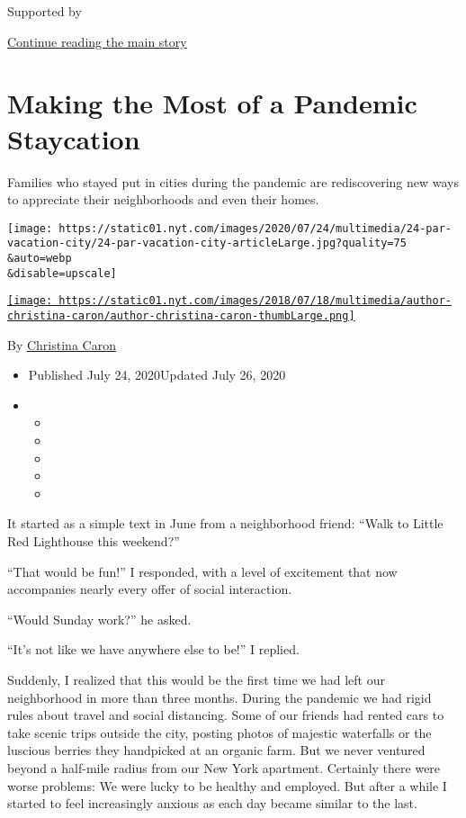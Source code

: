 Supported by

\protect\hyperlink{after-sponsor}{Continue reading the main story}

\hypertarget{making-the-most-of-a-pandemic-staycation}{%
\section{Making the Most of a Pandemic
Staycation}\label{making-the-most-of-a-pandemic-staycation}}

Families who stayed put in cities during the pandemic are rediscovering
new ways to appreciate their neighborhoods and even their homes.

\texttt{[image: https://static01.nyt.com/images/2020/07/24/multimedia/24-par-vacation-city/24-par-vacation-city-articleLarge.jpg?quality=75\\\&auto=webp\\\&disable=upscale]}

\href{https://www.nytimes.com/by/christina-caron}{\texttt{[image: https://static01.nyt.com/images/2018/07/18/multimedia/author-christina-caron/author-christina-caron-thumbLarge.png]}}

By \href{https://www.nytimes.com/by/christina-caron}{Christina Caron}

\begin{itemize}
\item
  Published July 24, 2020Updated July 26, 2020
\item
  \begin{itemize}
  \item
  \item
  \item
  \item
  \item
  \end{itemize}
\end{itemize}

It started as a simple text in June from a neighborhood friend: ``Walk
to Little Red Lighthouse this weekend?''

``That would be fun!'' I responded, with a level of excitement that now
accompanies nearly every offer of social interaction.

``Would Sunday work?'' he asked.

``It's not like we have anywhere else to be!'' I replied.

Suddenly, I realized that this would be the first time we had left our
neighborhood in more than three months. During the pandemic we had rigid
rules about travel and social distancing. Some of our friends had rented
cars to take scenic trips outside the city, posting photos of majestic
waterfalls or the luscious berries they handpicked at an organic farm.
But we never ventured beyond a half-mile radius from our New York
apartment. Certainly there were worse problems: We were lucky to be
healthy and employed. But after a while I started to feel increasingly
anxious as each day became similar to the last.

